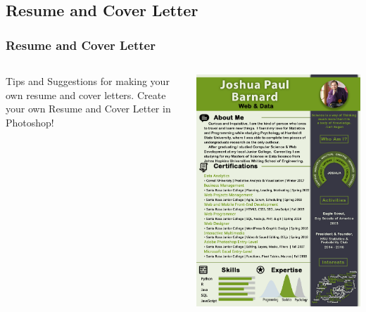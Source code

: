 \documentclass{beamer}
\begin{document}
	\subsection{Resume and Cover Letter}		
		\begin{frame}
			\frametitle{Resume and Cover Letter}
			\begin{columns}
				\vspace{-50pt}
			\begin{outline}
				\1 Tips and Suggestions for making your own resume and cover letters.
				\1 Create your own Resume and Cover Letter in Photoshop!
			\end{outline}
		\vspace{-10pt}
			\begin{center}
				\includegraphics[width=1.0\textwidth]{images/Joshua_Paul_Barnard-second_page.png}
			\end{center}
		\end{columns}
		\end{frame}
			
\end{document}
